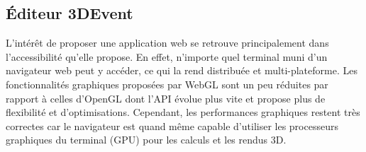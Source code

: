 \subsection{Éditeur 3DEvent}
L'intérêt de proposer une application web se 
retrouve principalement dans 
l'accessibilité qu'elle propose. En effet, n'importe 
quel terminal muni d'un 
navigateur web peut y accéder, ce qui la rend distribuée et multi-plateforme. 
Les fonctionnalités graphiques proposées par WebGL sont un peu réduites par 
rapport à celles d'OpenGL dont l'\gls{API} évolue plus vite et propose plus de 
flexibilité et d'optimisations. Cependant, les performances graphiques restent très 
correctes car le navigateur est quand même capable d'utiliser les processeurs 
graphiques du terminal (GPU) pour les calculs et les rendus \gls{3D}.

